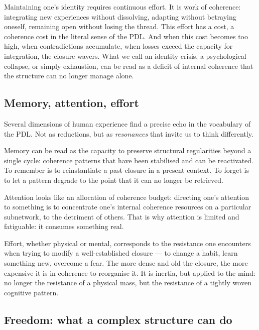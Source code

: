 \documentclass[12pt, a4paper, openright]{book}
\begin{document}
\medskip

Maintaining one’s identity requires continuous effort. It is work of coherence: integrating new experiences without dissolving, adapting without betraying oneself, remaining open without losing the thread. This effort has a cost, a coherence cost in the literal sense of the PDL. And when this cost becomes too high, when contradictions accumulate, when losses exceed the capacity for integration, the closure wavers. What we call an identity crisis, a psychological collapse, or simply exhaustion, can be read as a deficit of internal coherence that the structure can no longer manage alone.

\subsection*{Memory, attention, effort}

Several dimensions of human experience find a precise echo in the vocabulary of the PDL. Not as reductions, but as \emph{resonances} that invite us to think differently.

\medskip

Memory can be read as the capacity to preserve structural regularities beyond a single cycle: coherence patterns that have been stabilised and can be reactivated. To remember is to reinstantiate a past closure in a present context. To forget is to let a pattern degrade to the point that it can no longer be retrieved.

\medskip

Attention looks like an allocation of coherence budget: directing one’s attention to something is to concentrate one’s internal coherence resources on a particular subnetwork, to the detriment of others. That is why attention is limited and fatiguable: it consumes something real.

\medskip

Effort, whether physical or mental, corresponds to the resistance one encounters when trying to modify a well-established closure — to change a habit, learn something new, overcome a fear. The more dense and old the closure, the more expensive it is in coherence to reorganise it. It is inertia, but applied to the mind: no longer the resistance of a physical mass, but the resistance of a tightly woven cognitive pattern.

\subsection*{Freedom: what a complex structure can do}
\end{document}
